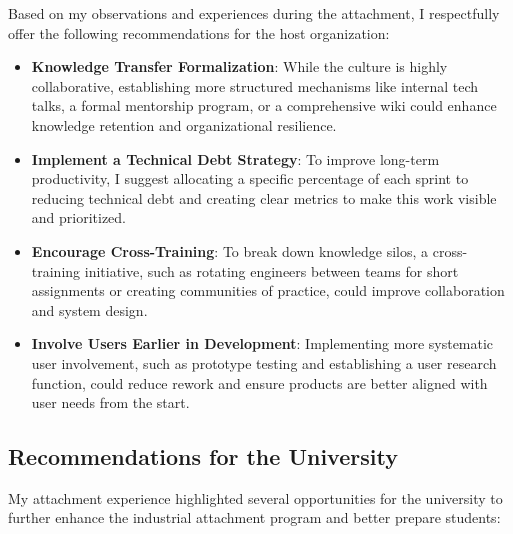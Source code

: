 \documentclass[12pt,a4paper]{article}
\begin{document}
Based on my observations and experiences during the attachment, I respectfully offer the following recommendations for the host organization:

\begin{itemize}
    \item \textbf{Knowledge Transfer Formalization}: While the culture is highly collaborative, establishing more structured mechanisms like internal tech talks, a formal mentorship program, or a comprehensive wiki could enhance knowledge retention and organizational resilience.
    
    \item \textbf{Implement a Technical Debt Strategy}: To improve long-term productivity, I suggest allocating a specific percentage of each sprint to reducing technical debt and creating clear metrics to make this work visible and prioritized.
    
    \item \textbf{Encourage Cross-Training}: To break down knowledge silos, a cross-training initiative, such as rotating engineers between teams for short assignments or creating communities of practice, could improve collaboration and system design.
    
    \item \textbf{Involve Users Earlier in Development}:  Implementing more systematic user involvement, such as prototype testing and establishing a user research function, could reduce rework and ensure products are better aligned with user needs from the start.
\end{itemize}

\subsection{Recommendations for the University}

My attachment experience highlighted several opportunities for the university to further enhance the industrial attachment program and better prepare students:
\end{document}
